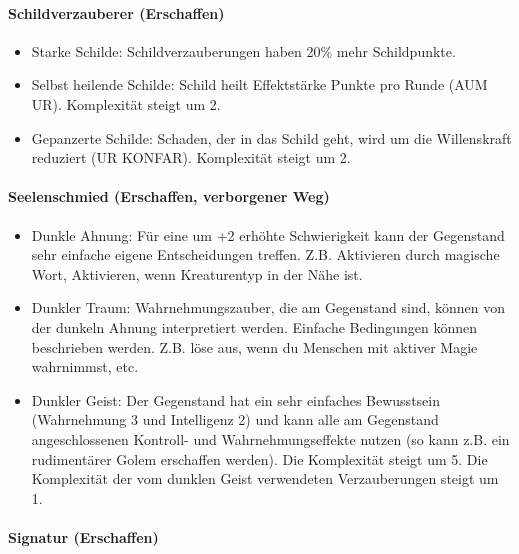 \documentclass{article}
\begin{document}
\paragraph{Schildverzauberer (Erschaffen)}

\begin{itemize}
\item Starke Schilde: Schildverzauberungen haben 20\% mehr Schildpunkte.
\item Selbst heilende Schilde: Schild heilt Effektstärke Punkte pro Runde (AUM UR). Komplexität steigt um 2.
\item Gepanzerte Schilde: Schaden, der in das Schild geht, wird um die Willenskraft reduziert (UR KONFAR). Komplexität steigt um 2.
\end{itemize}

\paragraph{Seelenschmied (Erschaffen, verborgener Weg)}

\begin{itemize}
\item Dunkle Ahnung: Für eine um +2 erhöhte Schwierigkeit kann der Gegenstand sehr einfache eigene Entscheidungen treffen. Z.B. Aktivieren durch magische Wort, Aktivieren, wenn Kreaturentyp in der Nähe ist.
\item Dunkler Traum: Wahrnehmungszauber, die am Gegenstand sind, können von der dunkeln Ahnung interpretiert werden. Einfache Bedingungen können beschrieben werden. Z.B. löse aus, wenn du Menschen mit aktiver Magie wahrnimmst, etc.
\item Dunkler Geist: Der Gegenstand hat ein sehr einfaches Bewusstsein (Wahrnehmung 3 und Intelligenz 2) und kann alle am Gegenstand angeschlossenen Kontroll- und Wahrnehmungseffekte nutzen (so kann z.B. ein rudimentärer Golem erschaffen werden). Die Komplexität steigt um 5. Die Komplexität der vom dunklen Geist verwendeten Verzauberungen steigt um 1.
\end{itemize}

\paragraph{Signatur (Erschaffen)}
\end{document}
